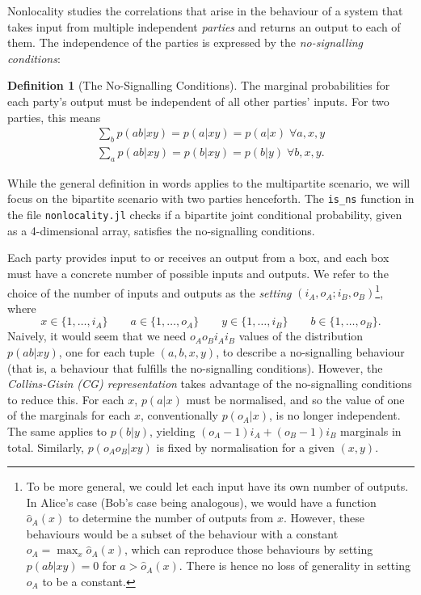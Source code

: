 \documentclass[10pt, a4paper]{article}
\numberwithin{equation}{section} %
\newcounter{stmt} %
\theoremstyle{definition}
\newtheorem{defn}[stmt]{Definition}
\theoremstyle{plain}
\newcommand{\dintv}[2]{\mathopen\{#1,\ldots,#2\mathclose\}}
\newcommand{\?}{\mathrel{?}} %
\begin{document}
    Nonlocality studies the correlations that arise in the behaviour of a system that takes input from multiple independent \emph{parties} and returns an output to each of them. The independence of the parties is expressed by the \emph{no-signalling conditions}:
    \begin{defn}[The No-Signalling Conditions]\label{def:nscond}
      The marginal probabilities for each party's output must be independent of all other parties' inputs. For two parties, this means
      \begin{gather}
        \sum_b p(ab|xy) = p(a|xy) = p(a|x)\;\forall a,x,y \\
        \sum_a p(ab|xy) = p(b|xy) = p(b|y)\;\forall b,x,y.
      \end{gather}
    \end{defn}
    While the general definition in words applies to the multipartite scenario, we will focus on the bipartite scenario with two parties henceforth. The \verb`is_ns` function in the file \verb`nonlocality.jl` checks if a bipartite joint conditional probability, given as a 4-dimensional array, satisfies the no-signalling conditions.

    Each party provides input to or receives an output from a box, and each box must have a concrete number of possible inputs and outputs. We refer to the choice of the number of inputs and outputs as the \emph{setting} \((i_A, o_A; i_B, o_B)\)\footnote{To be more general, we could let each input have its own number of outputs. In Alice's case (Bob's case being analogous), we would have a function \(\hat{o}_A(x)\) to determine the number of outputs from \(x\). However, these behaviours would be a subset of the behaviour with a constant \(o_A = \max_x \hat{o}_A(x)\), which can reproduce those behaviours by setting \(p(ab|xy) = 0\) for \(a > \hat{o}_A(x)\). There is hence no loss of generality in setting \(o_A\) to be a constant.}, where
    \[ x \in \dintv{1}{i_A} \qquad a \in \dintv{1}{o_A} \qquad y \in \dintv{1}{i_B} \qquad b \in \dintv{1}{o_B}. \]
    Naively, it would seem that we need \(o_A o_B i_A i_B\) values of the distribution \(p(ab|xy)\), one for each tuple \((a, b, x, y)\), to describe a no-signalling behaviour (that is, a behaviour that fulfills the no-signalling conditions). However, the \emph{Collins-Gisin (CG) representation} takes advantage of the no-signalling conditions to reduce this. For each \(x\), \(p(a|x)\) must be normalised, and so the value of one of the marginals for each \(x\), conventionally \(p(o_A|x)\), is no longer independent. The same applies to \(p(b|y)\), yielding \((o_A-1)i_A + (o_B-1)i_B\) marginals in total. Similarly, \(p(o_A o_B|xy)\) is fixed by normalisation for a given \((x,y)\).
\end{document}
